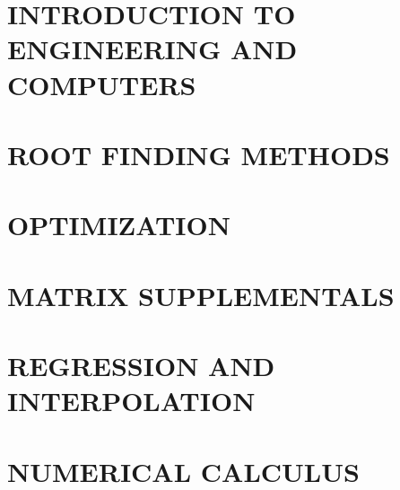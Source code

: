 \documentclass{book}
\begin{document}






%

\section{INTRODUCTION TO ENGINEERING AND COMPUTERS}







\section{ROOT FINDING METHODS}







%

%

\section{OPTIMIZATION}





\section{MATRIX SUPPLEMENTALS}





\section{REGRESSION AND INTERPOLATION}









\section{NUMERICAL CALCULUS}
\end{document}
